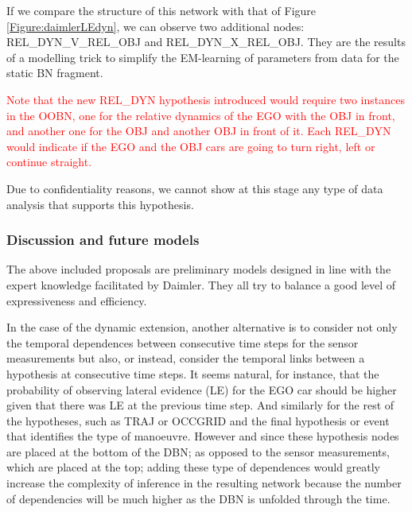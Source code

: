 If we compare the structure of this network with that of Figure \ref{Figure:daimlerLEdyn}, we can observe two additional nodes:  REL\_DYN\_V\_REL\_OBJ and REL\_DYN\_X\_REL\_OBJ. They are the results of a modelling trick to simplify the EM-learning of parameters from data for the static BN fragment.

\textcolor{red}{Note that the new REL\_DYN hypothesis introduced would require two instances in the OOBN, one for the relative dynamics of the EGO with the OBJ in front, and another one for the OBJ and another OBJ in front of it. Each REL\_DYN would indicate if the EGO and the OBJ cars are going to turn right, left or continue straight.}

Due to confidentiality reasons, we cannot show at this stage any type of data analysis that supports this hypothesis. 

\subsubsection*{Discussion and future models}
The above included proposals are preliminary models designed in line with the expert knowledge facilitated by Daimler. They all try to balance a good level of expressiveness and efficiency. 

In the case of the dynamic extension, another alternative is to consider not only the temporal dependences between consecutive time steps for the sensor measurements but also, or instead, consider the temporal links between a hypothesis at consecutive time steps. It seems natural, for instance, that the probability of observing lateral evidence (LE) for the EGO car should be higher given that there was LE at the previous time step. And similarly for the rest of the hypotheses, such as TRAJ or OCCGRID  and the final hypothesis or event that identifies the type of manoeuvre. However and since these hypothesis nodes are placed at the bottom of the DBN; as opposed to the sensor measurements, which are placed at the top; adding these type of dependences would greatly increase the complexity of inference in the resulting network because the number of dependencies will be much higher as the DBN is unfolded through the time. 

